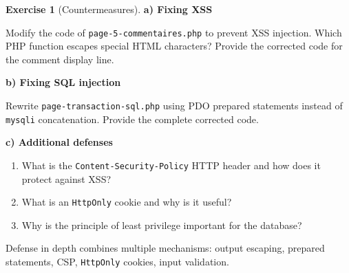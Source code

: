 \documentclass[a4paper,11pt]{article}
\theoremstyle{plain}
\theoremstyle{definition}
\newtheorem{exercice}{Exercise}
\begin{document}
\begin{exercice}[Countermeasures]

\textbf{a) Fixing XSS}

\medskip

Modify the code of \texttt{page-5-commentaires.php} to prevent XSS injection. Which PHP function escapes special HTML characters? Provide the corrected code for the comment display line.

\medskip

\textbf{b) Fixing SQL injection}

\medskip

Rewrite \texttt{page-transaction-sql.php} using PDO prepared statements instead of \texttt{mysqli} concatenation. Provide the complete corrected code.

\medskip

\textbf{c) Additional defenses}

\begin{enumerate}
    \item What is the \texttt{Content-Security-Policy} HTTP header and how does it protect against XSS?
    \item What is an \texttt{HttpOnly} cookie and why is it useful?
    \item Why is the principle of least privilege important for the database?
\end{enumerate}

\begin{pointcle}
Defense in depth combines multiple mechanisms: output escaping, prepared statements, CSP, \texttt{HttpOnly} cookies, input validation.
\end{pointcle}

\end{exercice}
\end{document}
